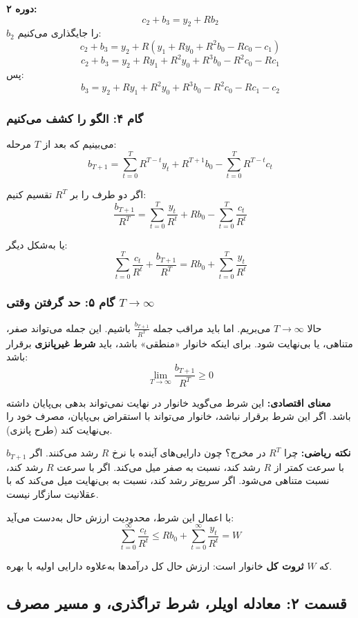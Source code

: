 \documentclass[12pt,a4paper]{article}
\begin{document}
\textbf{دوره ۲:}
\[
	c_2 + b_3 = y_2 + R b_2
\]
$b_2$ را جایگذاری می‌کنیم:
\[
	c_2 + b_3 = y_2 + R(y_1 + R y_0 + R^2 b_0 - R c_0 - c_1)
\]
\[
	c_2 + b_3 = y_2 + R y_1 + R^2 y_0 + R^3 b_0 - R^2 c_0 - R c_1
\]
پس:
\[
	b_3 = y_2 + R y_1 + R^2 y_0 + R^3 b_0 - R^2 c_0 - R c_1 - c_2
\]

\subsubsection{گام ۴: الگو را کشف می‌کنیم}

می‌بینیم که بعد از $T$ مرحله:
\[
	b_{T+1} = \sum_{t=0}^{T} R^{T-t} y_t + R^{T+1} b_0 - \sum_{t=0}^{T} R^{T-t} c_t
\]

اگر دو طرف را بر $R^T$ تقسیم کنیم:
\[
	\frac{b_{T+1}}{R^T} = \sum_{t=0}^{T} \frac{y_t}{R^t} + R b_0 - \sum_{t=0}^{T} \frac{c_t}{R^t}
\]

یا به‌شکل دیگر:
\[
	\sum_{t=0}^{T} \frac{c_t}{R^t} + \frac{b_{T+1}}{R^T} = R b_0 + \sum_{t=0}^{T} \frac{y_t}{R^t}
\]

\subsubsection{گام ۵: حد گرفتن وقتی $T \to \infty$}

حالا $T \to \infty$ می‌بریم. اما باید مراقب جمله $\frac{b_{T+1}}{R^T}$ باشیم. این جمله می‌تواند صفر، متناهی، یا بی‌نهایت شود. برای اینکه خانوار «منطقی» باشد، باید \textbf{شرط غیرپانزی} برقرار باشد:
\[
	\lim_{T \to \infty} \frac{b_{T+1}}{R^T} \geq 0
\]

\textbf{معنای اقتصادی:} این شرط می‌گوید خانوار در نهایت نمی‌تواند بدهی بی‌پایان داشته باشد. اگر این شرط برقرار نباشد، خانوار می‌تواند با استقراض بی‌پایان، مصرف خود را بی‌نهایت کند (طرح پانزی).

\textbf{نکته ریاضی:} چرا $R^T$ در مخرج؟ چون دارایی‌های آینده با نرخ $R$ رشد می‌کنند. اگر $b_{T+1}$ با سرعت کمتر از $R$ رشد کند، نسبت به صفر میل می‌کند. اگر با سرعت $R$ رشد کند، نسبت متناهی می‌شود. اگر سریع‌تر رشد کند، نسبت به بی‌نهایت میل می‌کند که با عقلانیت سازگار نیست.

با اعمال این شرط، محدودیت ارزش حال به‌دست می‌آید:
\[
	\boxed{\sum_{t=0}^{\infty} \frac{c_t}{R^t} \leq R b_0 + \sum_{t=0}^{\infty} \frac{y_t}{R^t} = W}
\]

که $W$ \textbf{ثروت کل} خانوار است: ارزش حال کل درآمدها به‌علاوه دارایی اولیه با بهره.

\subsection{قسمت ۲: معادله اویلر، شرط تراگذری، و مسیر مصرف}
\end{document}
